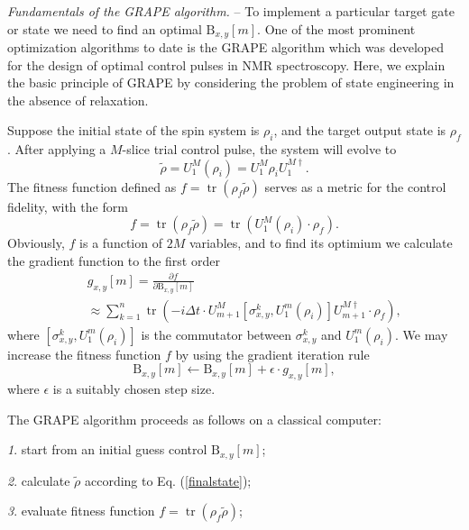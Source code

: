 \documentclass[twocolumn,reprint, amsmath,amssymb,showpacs,superscriptaddress]{revtex4-1}
\newcommand{\be}{\begin{equation}}
\newcommand{\ee}{\end{equation}}
\newcommand{\bea}{\begin{eqnarray}}
\newcommand{\eea}{\end{eqnarray}}
\begin{document}
\emph{Fundamentals of the GRAPE algorithm.} -- To implement  a particular target gate or state we  need to find an  optimal $\text{B}_{x,y}[m]$.  One of the most prominent optimization algorithms to date is the GRAPE algorithm \cite{khaneja2005optimal} which was developed for the design of optimal control pulses in NMR spectroscopy.
Here, we explain the basic principle of   GRAPE   by considering the problem of state engineering in the absence  of relaxation.

Suppose the initial  state of the spin system is $\rho_i$, and the target output state is $\rho_f$. After applying a $M$-slice trial control pulse,  the system will evolve to
\begin{equation}
\tilde \rho = U_{1}^{M} \left(\rho_i\right) = U_{1}^{M} \rho_i U_{1}^{M\dag}.
\label{finalstate}
\end{equation}
The fitness function defined as $f = \operatorname{tr} (\rho_f \tilde \rho)$ serves as a metric for the control fidelity, with the form
 \be
 f = \operatorname{tr} (\rho_f \tilde \rho) = \operatorname{tr} \left( U_{1}^{M} \left(\rho_i\right) \cdot \rho_f \right).
 \label{fitness}
 \ee
Obviously, $f$ is a function of $2M$ variables, and to find its optimium we calculate the gradient function to the first order
\bea
&& g_{x,y} [m]   =  \frac{\partial f}{\partial \text{B}_{x,y}[m]}    \nonumber \\  \label{gradient2}
 && \approx  \sum\limits_{k = 1}^n {\operatorname{tr} \left( { - i \Delta t \cdot {U_{m+1}^{M}} \left[ {\sigma_{x,y}^k,U_{1}^{m} \left(\rho_i\right)}  \right] U_{m+1}^{M\dag} \cdot  \rho_f} \right) },
\eea
where $\left[ {\sigma_{x,y}^k,U_{1}^{m} \left(\rho_i\right)}  \right]$ is the commutator between $\sigma_{x,y}^k$ and $U_{1}^{m} \left(\rho_i\right)$. We may increase the fitness function $f$ by using the gradient iteration rule
\begin{equation}
\text{B}_{x,y}[m] \leftarrow \text{B}_{x,y}[m] + \epsilon \cdot g_{x,y} [m],
\label{iteration}
\end{equation}
where $\epsilon$ is a suitably chosen step size.

The GRAPE algorithm proceeds as follows on a classical computer:

\emph{1}. start from an initial guess control $\text{B}_{x,y}[m]$;

\emph{2}. calculate $\tilde \rho$ according to Eq. (\ref{finalstate});

\emph{3}. evaluate fitness function $f = \operatorname{tr} (\rho_f \tilde \rho)$;
\end{document}
